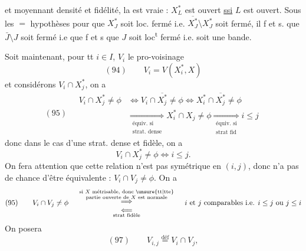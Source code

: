 
et moyennant densité et fidélité, la   est vraie : $X_L^*$ est ouvert \uline{ssi} $L$ est ouvert. Sous les $=$ hypothèses pour que $X_J^*$ soit loc. fermé i.e. $\overline{X_J^*}\setminus X_J^*$  soit fermé,  il f et s. que $\bar J\setminus J$ soit fermé i.e que f et s que $J$ soit loc\textsuperscript{t} fermé i.e. soit une bande.

Soit maintenant, pour tt $i\in I$, $V_i$ le pro-voisinage
\[(94)\qquad V_i=V(X_i^*,X)\]
et considérons $V_i\cap X_j^*$, on a
\[
(95)\quad\begin{aligned}
V_i\cap X_j^*\neq\phi&\Longleftrightarrow V_i\cap\overline{X_j^*}\neq\phi\Longleftrightarrow X_i^*\cap\overline{X_j^*}\neq\phi\\
&\underset{\substack{\text{équiv. si}\\\text{strat. dense}}}{\Longrightarrow}X_i^*\cap X_j\neq\phi\underset{\substack{\text{équiv. si}\\\text{strat fid}}}{\Longrightarrow}i\leq j
\end{aligned}
\]
donc dans le cas d'une strat. dense et fidèle,  on a
\[V_i\cap X_j^*\neq\phi\Longleftrightarrow i\leq j.\]
On fera attention que cette relation n'est pas symétrique en $(i,j)$,  donc n'a pas de chance d'être équivalente : $V_i\cap V_j\neq\phi$. On a
\[
(95)\qquad V_i\cap V_j\neq\phi\quad
\begin{array}{c}
\overset{\substack{\text{si $X$ métrisable, donc \unsure{tt|tte}}\\\text{partie ouverte de $X$ est normale}}}{\Longrightarrow}\\
\underset{\text{strat fidèle}}{\Longleftarrow}
\end{array}
\quad\text{$i$ et $j$ comparables i.e. $i\leq j$ ou $j\leq i$}
\]
On posera
\[(97)\qquad V_{i,j}\overset{\mathrm{déf}}=V_i\cap V_j,\]
